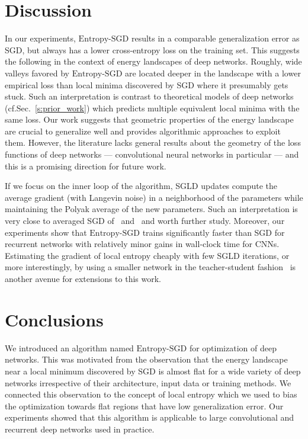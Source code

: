 \documentclass[10pt]{article}
\newcommand{\entropysgd}{\mathrm{Entropy}\textrm{-}\mathrm{SGD}}
\newcommand{\pc}[2]{{\color{ForestGreen}#1}\marginpar{\tiny\noindent{\raggedright{\color{Sienna}[PC]}\color{Sienna}{#2} \par}}}
\begin{document}
\section{Discussion}
\label{s:discussion}

In our experiments, $\entropysgd$ results in a comparable generalization error as SGD, but always has a lower cross-entropy loss on the training set. This suggests the following in the context of energy landscapes of deep networks. Roughly, wide valleys favored by $\entropysgd$ are located deeper in the landscape with a lower empirical loss than local minima discovered by SGD where it presumably gets stuck. Such an interpretation is contrast to theoretical models of deep networks (cf.\@ Sec.~\ref{s:prior_work}) which predicts multiple equivalent local minima with the same loss. Our work suggests that geometric properties of the energy landscape are crucial to generalize well and provides algorithmic approaches to exploit them. However, the literature lacks general results about the geometry of the loss functions of deep networks --- convolutional neural networks in particular --- and this is a promising direction for future work.

\pc{If we focus on the inner loop of the algorithm, SGLD updates compute the average gradient (with Langevin noise) in a neighborhood of the parameters while maintaining the Polyak average of the new parameters. Such an interpretation is very close to averaged SGD of~\citet{polyak1992acceleration} and~\citet{bottou2012stochastic} and worth further study. Moreover, our experiments show that $\entropysgd$ trains significantly faster than SGD for recurrent networks with relatively minor gains in wall-clock time for CNNs. Estimating the gradient of local entropy cheaply with few SGLD iterations, or more interestingly, by using a smaller network in the teacher-student fashion~\citep{balan2015bayesian} is another avenue for extensions to this work.}{don't want to give away the farm}

\section{Conclusions}
\label{s:conclusions}

We introduced an algorithm named $\entropysgd$ for optimization of deep networks. This was motivated from the observation that the energy landscape near a local minimum discovered by SGD is almost flat for a wide variety of deep networks irrespective of their architecture, input data or training methods. We connected this observation to the concept of local entropy which we used to bias the optimization towards flat regions that have low generalization error. Our experiments showed that this algorithm is applicable to large convolutional and recurrent deep networks used in practice.
\end{document}
